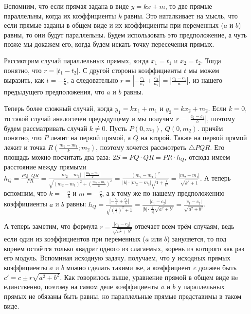 \begin{itemize}
    Вспомним, что если прямая задана в виде $y = kx + m$, то две прямые параллельны, когда их коэффициенты $k$ равны. Это наталкивает на мысль, что если прямые заданы в общем виде и их коэффициенты при переменных ($a$ и $b$) равны, то они будут параллельны. Будем использовать это предположение, а чуть позже мы докажем его, когда будем искать точку пересечения прямых.
    
    Рассмотрим случай параллельных прямых, когда $x_1 = t_1$ и $x_2 = t_2$. Тогда понятно, что $r = |t_1 - t_2|$. С другой стороны коэффициенты $t$ мы можем выразить, как $t = -\frac{c}{a}$, а следовательно $r = \left| -\frac{c_1}{a_1} + \frac{c_2}{a_2} \right| = \left| \frac{c_2 - c_1}{a} \right|$, из нашего предыдущего предположения, что $a$ и $b$ равны.
    
    Теперь более сложный случай, когда $y_1 = k x_1 + m_1$ и $y_2 = k x_2 + m_2$. Если $k = 0$, то такой случай аналогичен предыдущему и мы получим $r = \left| \frac{c_2 - c_1}{b} \right|$, поэтому будем рассматривать случай $k \ne 0$. Пусть $P(0, m_1)$, $Q(0, m_2)$. причём понятно, что $P$ лежит на первой прямой, а $Q$ на второй. Также на первой прямой лежит и точка $R(\frac{m_2 - m_1}{k}; m_2)$, поэтому хочется рассмотреть $\triangle PQR$. Его площадь можно посчитать два раза: $2S = PQ \cdot QR = PR \cdot h_Q$, отсюда имеем расстояние между прямыми $h_Q = \frac{PQ \cdot QR}{PR} = \frac{|m_2 - m_1| \cdot \left| \frac{m_2 - m_1}{k} \right|}{\sqrt{(m_2 - m_1)^2 + \left( \frac{m_2 - m_1}{k} \right)^2}} = \frac{(m_2 - m_1)^2}{|k| \cdot |m_2 - m_1| \sqrt{1 + \frac{1}{k^2}}} = \frac{|m_2 - m_1|}{\sqrt{k^2 + 1}}$. А теперь вспомним, что $k = -\frac{a}{b}$ и $m = -\frac{c}{b}$, а к тому же по нашему предположению коэффициенты $a$ и $b$ равны: $h_Q = \frac{|-\frac{c_2}{b} + \frac{c_1}{b}|} {\sqrt{(\frac{a}{b})^2 + 1}} = \frac{|c_1 - c_2|}{|b| \cdot \frac{1}{|b|} \sqrt{a^2 + b^2}} = \frac{|c_1 - c_2|}{\sqrt{a^2 + b^2}}$.
    
    А теперь заметим, что формула $r = \frac{|c_1 - c_2|}{\sqrt{a^2 + b^2}}$ отвечает всем трём случаям, ведь если один из коэффициентов при переменных ($a$ или $b$) зануляется, то под корнем остаётся только квадрат одного из слагаемых, корень из которого как раз его модуль. Вспоминая исходную задачу. получаем, что у исходных прямых коэффициенты $a$ и $b$ можно сделать такими же, а коэффициент $c$ должен быть $c' = c \pm r \sqrt{a^2 + b^2}$. Как говорилось выше, уравнение прямой в общем виде нe единственно, поэтому на самом деле коэффициенты $a$ и $b$ у параллельных прямых не обязаны быть равны, но параллельные прямые представимы в таком виде.
    

\end{itemize}
